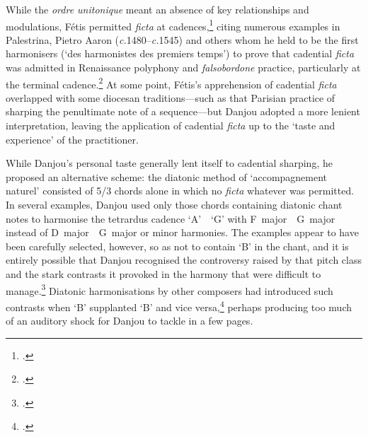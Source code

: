 \label{sc:fetis_sharping}%
While the \emph{ordre unitonique} meant an absence of key relationships and modulations, Fétis permitted \textit{ficta} at cadences,\footcite[14]{WagenerBegleitunggregorianischenChorals1964}
citing numerous examples in Palestrina, Pietro Aaron (\emph{c.}1480--\emph{c.}1545) and others whom he held to be the first harmonisers (`des harmonistes des premiers temps') to prove that cadential \textit{ficta} was admitted in Renaissance polyphony and \emph{falsobordone} practice, particularly at the terminal cadence.\footcites[153--4]{FetisTraitecomplettheorie1867}[107--109]{Fetisdemitondansplainchant1845}
\label{pg:fetis-sharping}%
At some point, Fétis's apprehension of cadential \emph{ficta} overlapped with some diocesan traditions---such as that Parisian practice of sharping the penultimate note of a sequence---but Danjou adopted a more lenient interpretation, leaving the application of cadential \emph{ficta} up to the `taste and experience' of the practitioner.

While Danjou's personal taste generally lent itself to cadential sharping, he proposed an alternative scheme: the diatonic method of `accompagnement naturel' consisted of 5/3 chords alone in which no \emph{ficta} whatever was permitted.
In several examples, Danjou used only those chords containing diatonic chant notes to harmonise the tetrardus cadence `A'~\rightarrow{}~`G' with F~major~\rightarrow{}~G~major instead of D~major~\rightarrow{}~G~major or minor harmonies.
The examples appear to have been carefully selected, however, so as not to contain `B'\kern 1pt\flat{} in the chant, and it is entirely possible that Danjou recognised the controversy raised by that pitch class and the stark contrasts it provoked in the harmony that were difficult to manage.\footcite[11--18]{Danjouaccompagnementplainchant1848}
Diatonic harmonisations by other composers had introduced such contrasts when `B'\kern 1pt\flat{} supplanted `B'\kern 1pt\natural{} and vice versa,\footcite[5]{MougelRequiem1862} perhaps producing too much of an auditory shock for Danjou to tackle in a few pages.
\noclub[2]


